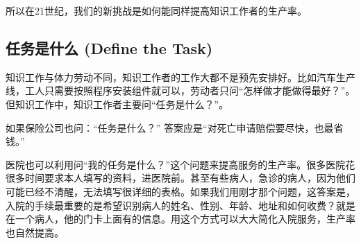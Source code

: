 所以在21世纪，我们的新挑战是如何能同样提高知识工作者的生产率。

\hypertarget{ux4efbux52a1ux662fux4ec0ux4e48-define-the-task}{%
\subsection{任务是什么 (Define the
Task)}\label{ux4efbux52a1ux662fux4ec0ux4e48-define-the-task}}

知识工作与体力劳动不同，知识工作者的工作大都不是预先安排好。比如汽车生产线，工人只需要按照程序安装组件就可以，劳动者只问``怎样做才能做得最好？''。但知识工作中，知识工作者主要问``任务是什么？''。


如果保险公司也问：``任务是什么？''
答案应是``对死亡申请赔偿要尽快，也最省钱。''


医院也可以利用问``我的任务是什么？''这个问题来提高服务的生产率。很多医院花很多时间要求本人填写的资料，进医院前。甚至有些病人，急诊的病人，因为他们可能已经不清醒，无法填写很详细的表格。如果我们用刚才那个问题，这答案是，入院的手续最重要的是希望识别病人的姓名、性别、年龄、地址和如何收费？就是在一个病人，他的门卡上面有的信息。用这个方式可以大大简化入院服务，生产率也自然提高。


